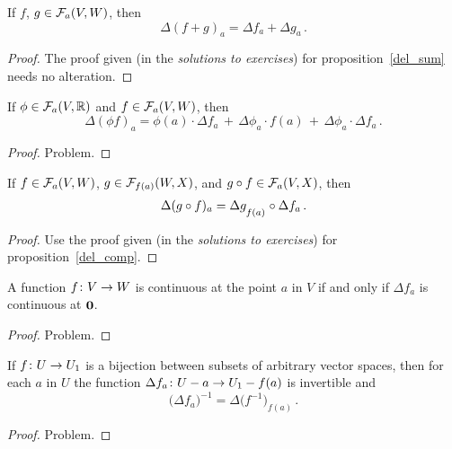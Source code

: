 \begin{prop}\label{prop_del_sum} If $f$, $g \in \mathcal{F}_a(V,W)$, then
  \[ \Delta(f+g)_a = \Delta f_a + \Delta g_a\,. \]
\end{prop}

\begin{proof} The proof given (in the \emph{solutions to exercises}) for
proposition~\ref{del_sum} needs no alteration.
\end{proof}

\begin{prop}\label{prop_del_mult}  If $\phi \in \mathcal{F}_a(V,\mathbb{R})$ and $f \in \mathcal{F}_a(V,W)$, then
  \[ \Delta(\phi f)_a = \phi(a)\cdot\Delta f_a \,+\, \Delta\phi_a\cdot f(a)
                                            \,+\, \Delta\phi_a\cdot\Delta f_a\,. \]
\end{prop}

\begin{proof} Problem.  \ns   \end{proof}

\begin{prop}\label{prop_del_comp} If $f \in \mathcal{F}_a(V,W)$, $g \in \mathcal{F}_{f(a)}(W,X)$, and
$g \circ f \in \mathcal{F}_a(V,X)$, then
  \[ \Delta(g \circ f)_a = \Delta g_{{}_{{\scriptstyle{f(a)}}}} \circ \Delta f_a\,. \]
\end{prop}

\begin{proof} Use the proof given (in the \emph{solutions to exercises}) for
proposition~\ref{del_comp}.
\end{proof}

\begin{prop}  A function $f \colon V \rightarrow W$ is continuous at the point $a$ in $V$  if and only if
$\Delta f_a$ is continuous at $\mathbf{0}$.
\end{prop}

\begin{proof} Problem.  \ns   \end{proof}

\begin{prop}\label{prop_del_inv}  If $f \colon U \rightarrow U_1$ is a bijection between subsets of
arbitrary vector spaces, then for each $a$ in $U$ the function $\Delta f_a \colon U - a \rightarrow
U_1 - f(a)$ is invertible and
  \[ \bigl(\Delta f_a\bigr)^{-1}=\Delta\bigl(f^{-1}\bigr)_{f(a)}\,. \]
\end{prop}

\begin{proof} Problem.   \ns    \end{proof}

